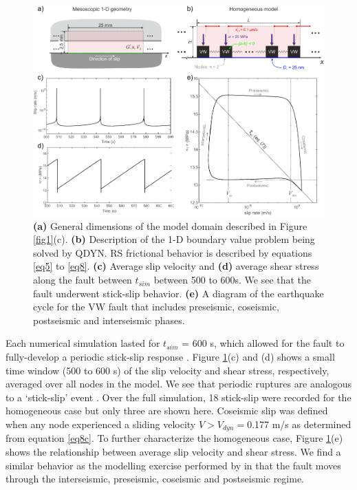 \documentclass[draft]{agujournal2019}
\begin{document}
\begin{figure}
	\centering
	\includegraphics{FIG5.pdf} 
	\caption{\textbf{(a)} General dimensions of the model domain described in Figure \ref{fig1}(c). \textbf{(b)} Description of the 1-D boundary value problem being solved by QDYN.  RS frictional behavior is described by equations \eqref{eq5} to \eqref{eq8}. \textbf{(c)} Average slip velocity and \textbf{(d)} average shear stress along the fault between $t_{sim}$ between 500 to 600s. We see that the fault underwent stick-slip behavior. \textbf{(e)} A diagram of the earthquake cycle for the VW fault that includes preseismic, coseismic, postseismic and interseismic phases.}
	\label{fig5}
\end{figure}

Each numerical simulation lasted for $t_{sim}$ = 600 s, which allowed for the fault to fully-develop a periodic stick-slip response \cite{Hillers2007}.  Figure \ref{fig5}(c) and (d) shows a small time window (500 to 600 s) of the slip velocity and shear stress, respectively, averaged over all nodes in the model.  We see that periodic ruptures are analogous to a `stick-slip' event \cite{Scholz2002}. Over the full simulation, 18 stick-slip were recorded for the homogeneous case but only three are shown here.  Coseismic slip was defined when any node experienced a sliding velocity $V > V_{dyn}=$0.177 m/s as determined from equation \eqref{eq8c}. To further characterize the homogeneous case, Figure \ref{fig5}(e) shows the relationship between average slip velocity and shear stress. We find a similar behavior as the modelling exercise performed by in that the fault moves through the interseismic, preseismic, coseismic and postseismic regime.
\end{document}
